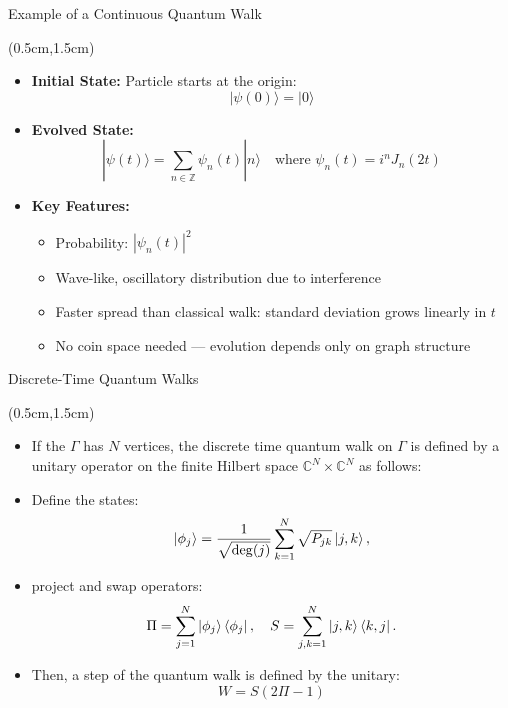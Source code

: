 \documentclass{beamer}
\theoremstyle{definition}
\begin{document}
\begin{frame}{Example of a Continuous Quantum Walk}

    
    \begin{textblock*}{12cm}(0.5cm,1.5cm)

       

        \begin{itemize}
            \item \textbf{Initial State:} Particle starts at the origin:
            \[
            |\psi(0)\rangle = |0\rangle
            \]
            
            \item \textbf{Evolved State:}
            \[
            |\psi(t)\rangle = \sum_{n \in \mathbb{Z}} \psi_n(t) |n\rangle
            \quad \text{where } \psi_n(t) = i^n J_n(2t)
            \]
        
            \item \textbf{Key Features:}
            \begin{itemize}
                \item Probability: \( |\psi_n(t)|^2 \)
                \item Wave-like, oscillatory distribution due to interference
                \item Faster spread than classical walk: standard deviation grows linearly in \( t \)
                \item No coin space needed — evolution depends only on graph structure
            \end{itemize}
        \end{itemize}

                   
    \end{textblock*}
\end{frame}





\begin{frame}{Discrete-Time Quantum Walks}
    \begin{textblock*}{12cm}(0.5cm,1.5cm)
        \begin{itemize}
           
            
            \item If the $\Gamma$ has $N$ vertices, the discrete time quantum walk on $\Gamma$ is defined by a unitary operator on the finite Hilbert space $\mathbb{C}^N \times \mathbb{C}^N$ as follows:
            \item Define the states:
            \[ \ket{\phi_j} = \frac{1}{\sqrt{\deg(j)}} \sum_{k = 1}^N \sqrt{P_{jk}}\ket{j, k}, \]
            \item project and swap operators:
            \[ \Pi = \sum_{j = 1}^N \ket{\phi_j} \bra{\phi_j}, \quad S = \sum_{j, k = 1}^N \ket{j, k} \bra{k, j}. \]
            \item Then, a step of the quantum walk is defined by the unitary:
             \[
             W = S(2\Pi - 1)
             \]

        \end{itemize}
    \end{textblock*}
\end{frame}
\end{document}
